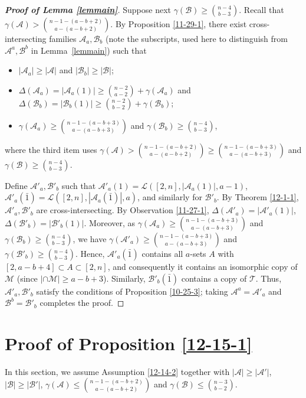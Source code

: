\documentclass[11pt]{article}
\newcommand{\m}{\mathcal}
\begin{document}
\begin{proof}[{\bf Proof of Lemma \ref{lemmain}}]
Suppose next $\gamma(\mathcal{B})\ge{n-4\choose b-3}$.  
Recall that  $\gamma(\mathcal{A})> {n-1-(a-b+2)\choose a-(a-b+2)}$. 
By Proposition \ref{11-29-1}, there exist cross-intersecting families $\mathcal{A}_a, \mathcal{B}_b$ (note the subscripts, used here to distinguish from $\mathcal{A}^a, \mathcal{B}^b$ in Lemma~\ref{lemmain}) such that
\begin{itemize}
    \item $|\mathcal{A}_a|\ge |\mathcal{A}|$ and $|\mathcal{B}_b|\ge |\mathcal{B}|$;
    \item $\Delta(\mathcal{A}_a)=|\m A_a(1)|\ge {n-2\choose a-2}+\gamma(\mathcal{A}_a)$ and 
$\Delta(\mathcal{B}_b)=|\m B_b(1)|\ge {n-2\choose b-2}+\gamma(\mathcal{B}_b)$;
    \item $\gamma(\mathcal{A}_a)\ge {n-1-(a-b+3)\choose a-(a-b+3)}$ and $\gamma(\mathcal{B}_b)\ge {n-4\choose b-3}$,
\end{itemize}
where the third item uses $\gamma(\mathcal{A})> {n-1-(a-b+2)\choose a-(a-b+2)}\ge {n-1-(a-b+3)\choose a-(a-b+3)}$ and $\gamma(\mathcal{B})\ge{n-4\choose b-3}$. 

Define $\mathcal{A}'_a, \mathcal{B}'_b$ such that $\mathcal{A}'_a(1)=\mathcal{L}([2,n], |\mathcal{A}_a(1)|, a-1)$, $\mathcal{A}'_a(\bar{1})=\mathcal{L}([2,n], |\mathcal{A}_a(\bar{1})|, a)$, and similarly for   $\mathcal{B}'_b$. By Theorem \ref{12-1-1}, $\mathcal{A}'_a, \mathcal{B}'_b$ are cross-intersecting. 
By Observation \ref{11-27-1}, $\Delta(\mathcal{A}'_a)=|\mathcal{A}'_a(1)|$, $\Delta(\mathcal{B}'_b)=|\mathcal{B}'_b(1)|$. 
Moreover, as $\gamma(\mathcal{A}_a)\ge {n-1-(a-b+3)\choose a-(a-b+3)}$ and $\gamma(\mathcal{B}_b)\ge {n-4\choose b-3}$, we have $\gamma(\mathcal{A}'_a)\ge {n-1-(a-b+3)\choose a-(a-b+3)}$ and $\gamma(\mathcal{B}'_b)\ge {n-4\choose b-3}$.
Hence, $\mathcal{A}'_a(\bar1)$ contains all $a$-sets $A$ with $[2,a-b+4]\subset A \subset [2,n]$, and consequently it contains an isomorphic copy of $\m M$ (since $|\cap \m M|\ge a-b+3$). 
Similarly,
$\mathcal{B}'_b(\bar1)$ contains a copy of $\m T$.
Thus, $\m A'_a, \m B'_b$ satisfy the conditions of Proposition \ref{10-25-3}; taking $\m A^a=\m A'_a$ and $\m B^b=\m B'_b$ completes the proof. 
\end{proof}

\section{Proof of Proposition \ref{12-15-1}}\label{secpro1} 
In this section, we assume Assumption \ref{12-14-2} together with $|\mathcal{A}|\ge |\mathcal{A}'|$, $|\mathcal{B}|\ge |\mathcal{B}'|$, $\gamma(\m A)\le{n-1-(a-b+2)\choose a-(a-b+2)}$ and $\gamma(\m B)\le {n-3\choose b-2}$.  
\end{document}
